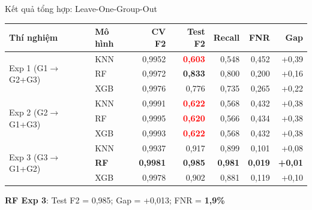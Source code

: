 \documentclass[aspectratio=169,12pt]{beamer}
\newcommand{\good}[1]{\textcolor{mygreen}{\textbf{#1}}}
\newcommand{\bad}[1]{\textcolor{red}{\textbf{#1}}}
\begin{document}
\begin{frame}{Kết quả tổng hợp: Leave-One-Group-Out}
  \begin{table}
    \centering
    \small
    \begin{tabular}{llrrrrr}
      \toprule
      \textbf{Thí nghiệm} & \textbf{Mô hình} & \textbf{CV F2} & \textbf{Test F2} & \textbf{Recall} & \textbf{FNR} & \textbf{Gap}\\
      \midrule
      \multirow{3}{*}{Exp 1 (G1$\to$G2+G3)}
        & KNN  & 0,9952 & \bad{0,603}  & 0,548 & 0,452 & +0,39 \\
        & RF   & 0,9972 & \good{0,833} & 0,800 & 0,200 & +0,16 \\
        & XGB  & 0,9976 & 0,776        & 0,735 & 0,265 & +0,22 \\
      \midrule
      \multirow{3}{*}{Exp 2 (G2$\to$G1+G3)}
        & KNN  & 0,9991 & \bad{0,622}  & 0,568 & 0,432 & +0,38 \\
        & RF   & 0,9995 & \bad{0,620}  & 0,566 & 0,434 & +0,38 \\
        & XGB  & 0,9993 & \bad{0,622}  & 0,568 & 0,432 & +0,38 \\
      \midrule
      \multirow{3}{*}{Exp 3 (G3$\to$G1+G2)}
        & KNN  & 0,9937 & 0,917        & 0,899 & 0,101 & +0,08 \\
        & \textbf{RF}  & \textbf{0,9981} & \good{\textbf{0,985}} & \textbf{0,981} & \good{\textbf{0,019}} & \good{\textbf{+0,01}} \\
        & XGB  & 0,9978 & 0,902        & 0,881 & 0,119 & +0,10 \\
      \bottomrule
    \end{tabular}
  \end{table}
  \vspace{-0.2em}
  \begin{center}
    \small \textbf{RF Exp 3}: Test F2 = 0,985; Gap = +0,013; FNR = \good{1,9\%}
  \end{center}
\end{frame}
\end{document}
